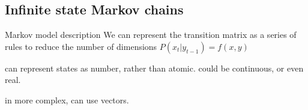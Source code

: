 
\subsection{Infinite state Markov chains}

Markov model description
We can represent the transition matrix as a series of rules to reduce the number of dimensions
\(P(x_t |y_{t-1})=f(x,y)\)

can represent states as number, rather than atomic. could be continuous, or even real.

in more complex, can use vectors.

